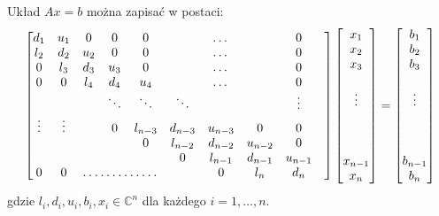 \documentclass[12pt]{article}
\begin{document}
	Układ $Ax = b$ można zapisać w postaci:
	\begin{equation}
		\begin{bmatrix}
			d_1    & u_1    & 0            & 0      & 0       &         & \dots   &         & 0       \\
			l_2    & d_2    & u_2          & 0      & 0       &         & \dots   &         & 0       \\
			0      & l_3    & d_3          & u_3    & 0       &         & \dots   &         & 0       \\
			0      & 0      & l_4          & d_4    & u_4     &         & \dots   &         & 0       \\
			       &        &              & \ddots & \ddots  & \ddots  &         &         & \vdots  \\
			\vdots & \vdots &              & 0      & l_{n-3} & d_{n-3} & u_{n-3} & 0       & 0       \\
			       &        &              &        & 0       & l_{n-2} & d_{n-2} & u_{n-2} & 0       \\
			       &        &              &        &         & 0       & l_{n-1} & d_{n-1} & u_{n-1} \\
			0      & 0      & \hdotsfor{3} &        & 0       & l_n     & d_n     &
		\end{bmatrix}
		\begin{bmatrix}
			x_1 \\
			x_2 \\
			x_3 \\
			\\
			\vdots\\
			\\
			\\
				\\
			x_{n-1} \\
			x_n
		\end{bmatrix}
		=
		\begin{bmatrix}
			b_1 \\
			b_2 \\
			b_3 \\
			\\
			\vdots\\
			\\
			\\
			\\
			b_{n-1} \\
			b_n
		\end{bmatrix}
		\label{eq:complex}
	\end{equation}
	gdzie $l_i, d_i, u_i, b_i, x_i \in \mathbb{C}^n$ dla każdego $i=1, \dots , n$.
	
\end{document}
